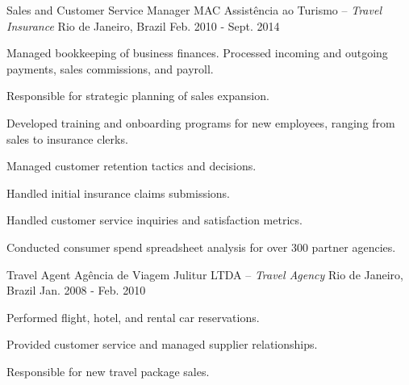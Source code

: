 \begin{cventries}
\cventry
{Sales and Customer Service Manager} %
{MAC Assistência ao Turismo \textmd{-- \em{Travel Insurance}}} %
{Rio de Janeiro, Brazil} %
{Feb. 2010 - Sept. 2014} %
{ %
\begin{cvitems}
\item {Managed bookkeeping of business finances. Processed incoming and outgoing payments, sales commissions, and payroll.}
\item {Responsible for strategic planning of sales expansion.}
\item {Developed training and onboarding programs for new employees, ranging from sales to insurance clerks.}
\item {Managed customer retention tactics and decisions.}
\item {Handled initial insurance claims submissions.}
\item {Handled customer service inquiries and satisfaction metrics.}
\item {Conducted consumer spend spreadsheet analysis for over 300 partner agencies.}
\end{cvitems}
}

\cventry
{Travel Agent} %
{Agência de Viagem Julitur LTDA \textmd{-- \em{Travel Agency}}} %
{Rio de Janeiro, Brazil} %
{Jan. 2008 - Feb. 2010} %
{ %
\begin{cvitems}
\item{Performed flight, hotel, and rental car reservations.}
\item{Provided customer service and managed supplier relationships.}
\item{Responsible for new travel package sales.}
\end{cvitems}
}


\end{cventries}